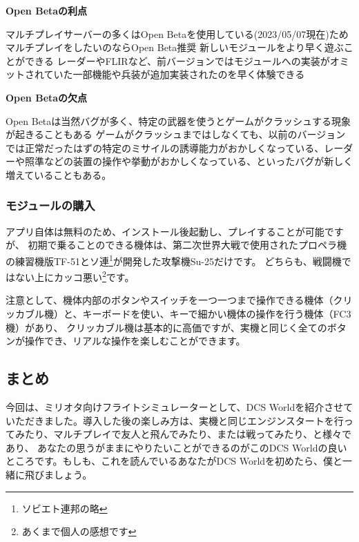 \textbf{Open Betaの利点}


マルチプレイサーバーの多くはOpen Betaを使用している(2023/05/07現在)ためマルチプレイをしたいのならOpen Beta推奨
新しいモジュールをより早く遊ぶことができる
レーダーやFLIRなど、前バージョンではモジュールへの実装がオミットされていた一部機能や兵装が追加実装されたのを早く体験できる


\textbf{Open Betaの欠点}


Open Betaは当然バグが多く、特定の武器を使うとゲームがクラッシュする現象が起きることもある
ゲームがクラッシュまではしなくても、以前のバージョンでは正常だったはずの特定のミサイルの誘導能力がおかしくなっている、レーダーや照準などの装置の操作や挙動がおかしくなっている、といったバグが新しく増えていることもある。

\subsubsection{モジュールの購入}
アプリ自体は無料のため、インストール後起動し、プレイすることが可能ですが、
初期で乗ることのできる機体は、第二次世界大戦で使用されたプロペラ機の練習機版TF-51とソ連\footnote{ソビエト連邦の略}が開発した攻撃機Su-25だけです。
どちらも、戦闘機ではない上にカッコ悪い\footnote{あくまで個人の感想です}です。


注意として、機体内部のボタンやスイッチを一つ一つまで操作できる機体（クリッカブル機）と、キーボードを使い、キーで細かい機体の操作を行う機体（FC3機）があり、
クリッカブル機は基本的に高価ですが、実機と同じく全てのボタンが操作でき、リアルな操作を楽しむことができます。

\subsection{まとめ}
今回は、ミリオタ向けフライトシミュレーターとして、DCS Worldを紹介させていただきました。導入した後の楽しみ方は、実機と同じエンジンスタートを行ってみたり、マルチプレイで友人と飛んでみたり、または戦ってみたり、と様々であり、
あなたの思うがままにやりたいことができるのがこのDCS Worldの良いところです。もしも、これを読んでいるあなたがDCS Worldを初めたら、僕と一緒に飛びましょう。